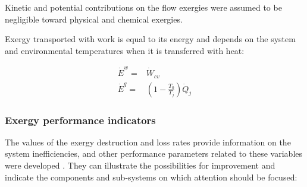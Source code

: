 \documentclass[final,times,5p]{elsarticle}
\begin{document}

	Kinetic and potential contributions on the flow exergies were assumed to be negligible toward physical and chemical exergies.	

	Exergy transported with work is equal to its energy and depends on the system and environmental temperatures when it is transferred with heat:

	\begin{align} 
		\dot{E}^w=&\dot{W}_{cv}\\
		\dot{E}^q=&\left(1-\frac{T_0}{T_j}\right)\dot{Q}_{j}
	\end{align}


	\subsubsection{Exergy performance indicators}
	The values of the exergy destruction and loss rates provide information on the system inefficiencies, and other performance parameters related to these variables were developed \cite{BejanAdrian;TsatsaronisGeorge;Moran1996,Kotas1980,Kotas1980a,Kotas1995}. They can illustrate the possibilities for improvement and indicate the components and sub-systems on which attention should be focused:
\end{document}
